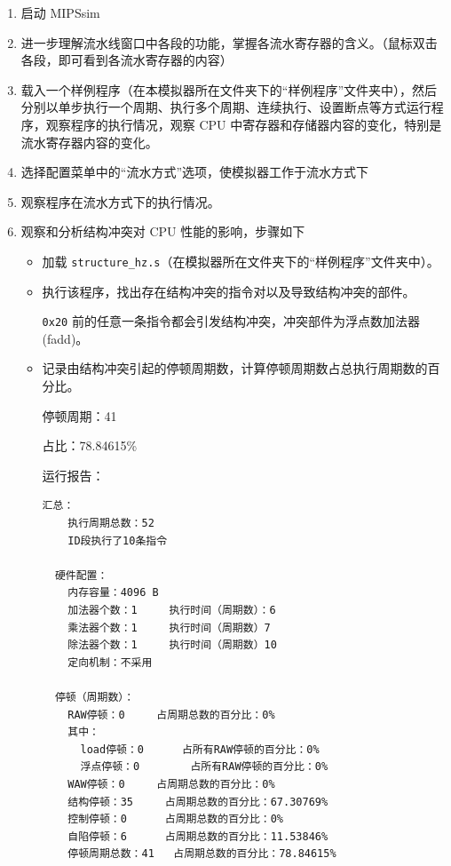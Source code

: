 \documentclass[blue,normal,cn]{elegantnote}
\newcommand{\code}[1]{\colorbox{light-gray}{\texttt{#1}}}
\begin{document}
\begin{enumerate}[wide=0pt, listparindent=2em, parsep=0pt]
    \item 启动 MIPSsim
    \item 进一步理解流水线窗口中各段的功能，掌握各流水寄存器的含义。（鼠标双击各段，即可看到各流水寄存器的内容）
    \item 载入一个样例程序（在本模拟器所在文件夹下的“样例程序”文件夹中），然后分别以单步执行一个周期、执行多个周期、连续执行、设置断点等方式运行程序，观察程序的执行情况，观察 CPU 中寄存器和存储器内容的变化，特别是流水寄存器内容的变化。
    \item 选择配置菜单中的“流水方式”选项，使模拟器工作于流水方式下
    \item 观察程序在流水方式下的执行情况。
    \item 观察和分析结构冲突对 CPU 性能的影响，步骤如下

          \begin{itemize}[leftmargin=3em, listparindent=2em, parsep=0pt]
              \item 加载 \code{structure\_hz.s}（在模拟器所在文件夹下的“样例程序”文件夹中）。
              \item 执行该程序，找出存在结构冲突的指令对以及导致结构冲突的部件。


                    \textcolor{ans}{\code{0x20} 前的任意一条指令都会引发结构冲突，冲突部件为浮点数加法器(fadd)。}


              \item 记录由结构冲突引起的停顿周期数，计算停顿周期数占总执行周期数的百分比。


                    \textcolor{ans} {停顿周期：41}

                    \textcolor{ans} {占比：78.84615\%}

                    \textcolor{ans}{运行报告：}
                    \begin{lstlisting}
汇总：
    执行周期总数：52
    ID段执行了10条指令

  硬件配置：
    内存容量：4096 B
    加法器个数：1		执行时间（周期数）：6
    乘法器个数：1		执行时间（周期数）7		
    除法器个数：1		执行时间（周期数）10		
    定向机制：不采用

  停顿（周期数）：
    RAW停顿：0		占周期总数的百分比：0%
    其中：
      load停顿：0		占所有RAW停顿的百分比：0%
      浮点停顿：0		占所有RAW停顿的百分比：0%
    WAW停顿：0		占周期总数的百分比：0%
    结构停顿：35		占周期总数的百分比：67.30769%
    控制停顿：0		占周期总数的百分比：0%
    自陷停顿：6		占周期总数的百分比：11.53846%
    停顿周期总数：41	占周期总数的百分比：78.84615%


\end{lstlisting}
\end{itemize}
\end{enumerate}
\end{document}
